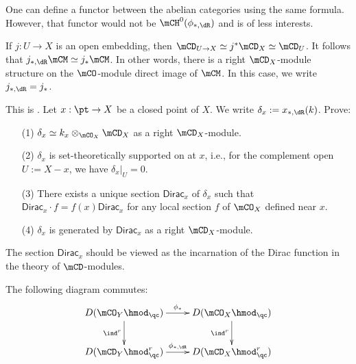 	\begin{warn}
		One can define a functor between the abelian categories using the same formula. However, that functor would not be $\mCH^0(\phi_{*,\dR})$ and is of less interests.
	\end{warn}

	\begin{exam}
		If $j:U\to X$ is an open embedding, then $\mCD_{U\to X} \simeq j^*\mCD_X \simeq \mCD_U$. It follows that $j_{*,\dR}\mCM \simeq j_*\mCM$. In other words, there is a right $\mCD_X$-module structure on the $\mCO$-module direct image of $\mCM$. In this case, we write $j_{*,\dR}=j_*$.
	\end{exam}

	\begin{exe}
		This is . Let $x:\pt \to X$ be a closed point of $X$. We write $\delta_x:= x_{*,\dR}(k)$. Prove:
		\begin{itemize}
			\item[(1)]
				$\delta_x\simeq k_x \ot_{\mCO_X}\mCD_X$ as a right $\mCD_X$-module.
			\item[(2)]
				$\delta_x$ is set-theoretically supported on at $x$, i.e., for the complement open $U:=X-x$, we have $\delta_x|_U = 0$.
			\item[(3)]
				There exists a unique section $\mathsf{Dirac}_x$ of $\delta_x$ such that $\mathsf{Dirac}_x\cdot f = f(x)\mathsf{Dirac}_x$ for any local section $f$ of $\mCO_X$ defined near $x$.
			\item[(4)]
				$\delta_x$ is generated by $\mathsf{Dirac}_x$ as a right $\mCD_X$-module.
		\end{itemize}
	\end{exe}

	\begin{rem}
		The section $\mathsf{Dirac}_x$ should be viewed as the incarnation of the Dirac function in the theory of $\mCD$-modules.
	\end{rem}

	

	\begin{lem}
		The following diagram commutes:
		\begin{equation}
			\label{eqn-push-vs-ind}
			\xymatrix{
				D(\mCO_Y\hmod_\qc) \ar[r]^-{\phi_*} \ar[d]_-{\ind^r} &
				D(\mCO_X\hmod_\qc) \ar[d]_-{\ind^r} \\
				D(\mCD_Y\hmod^r_\qc) \ar[r]^-{\phi_{*,\dR}}  &
				D(\mCD_X\hmod^r_\qc)
			}
		\end{equation}
	\end{lem}

